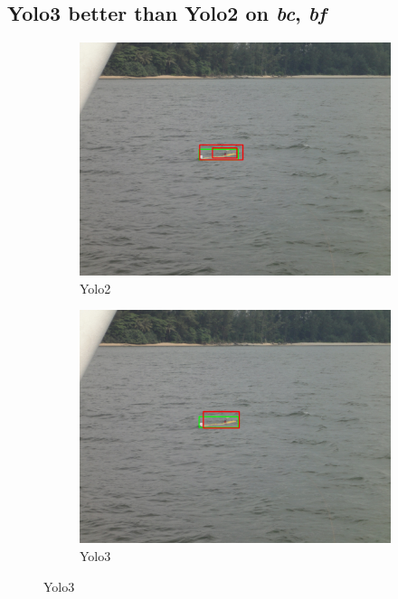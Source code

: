 \subsection{Yolo3 better than Yolo2 on \textit{bc}, \textit{bf}}
\label{sec:3better}
\begin{figure}[h!]
\begin{subfigure}{.5\textwidth}
  \centering
  \includegraphics[width=0.9\linewidth]{results/case_buildings/yolo23/3better/yolo2/DSC02490.jpg}
  \caption{Yolo2}
\end{subfigure}%
\begin{subfigure}{.5\textwidth}
  \centering
  \includegraphics[width=.9\linewidth]{results/case_buildings/yolo23/3better/yolo3/DSC02490.jpg}
  \caption{Yolo3}
\end{subfigure}


\end{figure}
